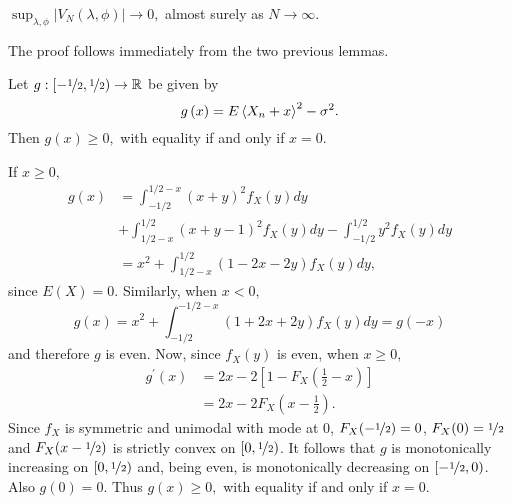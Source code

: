 \begin{theorem}
\label{th:vn}$\sup_{\lambda,\phi}\left\vert V_{N}\left(  \lambda,\phi\right)
\right\vert \rightarrow0,$ almost surely as $N\rightarrow\infty.$
\end{theorem}

\begin{IEEEproof}
The proof follows immediately from the two previous lemmas.
\end{IEEEproof}

\begin{lemma}
\label{lem:one} Let $g:[-\nicefrac{1}{2}, \nicefrac{1}{2})\rightarrow {\mathbb R}$ be given by
\[
g\left(  x\right)  =E\left<   X_{n}+x  \right>  ^{2}-\sigma^{2}.
\]
Then $g\left(  x\right)  \geq0,$ with equality if and only if $
x  = 0.$
\end{lemma}

\begin{IEEEproof}
If $x\geq0,$%
\begin{align*}
g\left(  x\right)   & =\int_{-1/2}^{1/2-x}\left(  x+y\right)  ^{2}f_X\left(
y\right)  dy \\
&+\int_{1/2-x}^{1/2}\left(  x+y-1\right)  ^{2}f_X \left(  y\right)
dy-\int_{-1/2}^{1/2}y^{2}f_X \left(  y\right)  dy\\
&  =x^{2}+\int_{1/2-x}^{1/2}\left(  1-2x-2y\right)  f_X \left(  y\right)  dy,
\end{align*}
since $E\left(  X\right)  =0.$ Similarly, when $x<0,$%
\[
g\left(  x\right)  =x^{2}+\int_{-1/2}^{-1/2-x}\left(  1+2x+2y\right)
f_X \left(  y\right)  dy  = g\left(  -x\right)
\]
and therefore $g$ is even. Now, since $f_X \left(  y\right)  $ is even, when $x\geq0,$%
\begin{align*}
g^{\prime}\left(  x\right)   &  =2x-2\left[  1-F_X \left(  \frac{1}{2}-x\right)
\right] \\
&  =2x-2F_X \left(  x-\frac{1}{2}\right).
\end{align*}
Since $f_X$ is symmetric and unimodal with mode at $0$, $F_X
(-\nicefrac{1}{2})=0$, $F_X(0)=\nicefrac{1}{2}$ and $F_X(x - \nicefrac{1}{2})$
is strictly convex on $[0, \nicefrac{1}{2})$.  It follows that $g$ is
monotonically increasing on $[0, \nicefrac{1}{2})$ and, being even, is
monotonically decreasing on $[-\nicefrac{1}{2}, 0)$.  Also $g(0) = 0$.  Thus
$g\left( x\right) \geq0,$ with equality if and only if $x=0.$
\end{IEEEproof}

